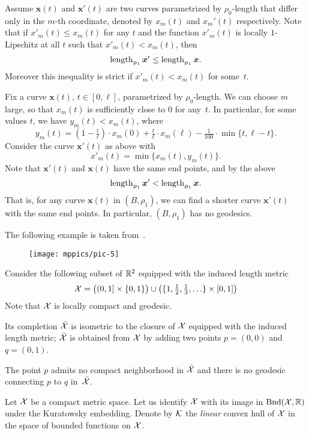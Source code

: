 Assume $\bm{x}(t)$ and $\bm{x}'(t)$ are two curves parametrized by $\rho_0$-length that differ only in the $m$-th coordinate, denoted by $x_m(t)$ and $x_m'(t)$ respectively.
Note that if $x'_m(t)\le x_m(t)$ for any $t$ and 
the function $x'_m(t)$ is locally $1$-Lipschitz at all $t$ such that $x'_m(t)< x_m(t)$, then 
\[\length_{\rho_1}\bm{x}'\le \length_{\rho_1}\bm{x}.\]
Moreover this inequality is strict if $x'_m(t)< x_m(t)$ for some~$t$.

Fix a curve $\bm{x}(t)$, $t\in[0,\ell]$, parametrized by  $\rho_0$-length.
We can choose $m$ large, so that $x_m(t)$ is sufficiently close to $0$ for any~$t$.
In particular, for some values $t$, we have $y_m(t)<x_m(t)$, where
\[y_m(t)=(1-\tfrac t\ell)\cdot x_m(0)
+\tfrac t\ell\cdot x_m(\ell)
-\tfrac 1{100}\cdot \min\{t,\ell-t\}.\]
Consider the curve $\bm{x}'(t)$ as above with
\[x'_m(t)=\min\{x_m(t),y_m(t)\}.\]
Note that $\bm{x}'(t)$ and $\bm{x}(t)$ have the same end points, and by the above
\[\mathop{\rm length}\nolimits_{\upvarrho_1}\bm{x}'<\mathop{\rm length}\nolimits_{\upvarrho_1}\bm{x}.\]
That is, for any curve $\bm{x}(t)$ in $(B,\rho_1)$, we can find a shorter curve $\bm{x}'(t)$ with the same end points.
In particular, $(B,\rho_1)$ has no geodesics.

The following example is taken from~\cite{bridson-haefliger}.

\medskip

\begin{wrapfigure}{r}{20 mm}
\vskip-0mm
\centering
\texttt{[image: mppics/pic-5]}
\end{wrapfigure}

Consider the following subset of $\mathbb{R}^2$ equipped with the induced length metric
\[
\spc{X}
=
\bigl((0,1]\times\{0,1\}\bigr)
\cup
\bigl(\{1,\tfrac12,\tfrac13,\dots\}\times[0,1]\bigr)
\]
Note that $\mathcal{X}$ is locally compact and geodesic.

Its completion $\bar{\mathcal{X}}$ is isometric to the closure of $\mathcal{X}$ equipped with the induced length metric;
$\bar{\mathcal{X}}$ is obtained from $\mathcal{X}$ by adding two points $p=(0,0)$ and $q=(0,1)$.

The point $p$ admits no compact neighborhood in $\bar{\mathcal{X}}$ 
and there is no geodesic connecting $p$ to $q$ in~$\bar{\mathcal{X}}$. \qeds 

\parbf{\ref{ex:compact-in-lenght}}
Let $\mathcal{X}$ be a compact metric space.
Let us identify $\mathcal{X}$ with its image in $\mathrm{Bnd}(\mathcal{X},\mathbb{R})$ under the Kuratowsky embedding.
Denote by $\mathcal{K}$ the {}\emph{linear} convex hull of $\mathcal{X}$ in the space of bounded functions on $\mathcal{X}$.

